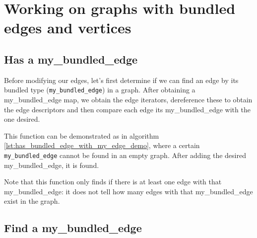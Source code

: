 \chapter{Working on graphs with bundled edges and vertices}

\section{Has a my\_bundled\_edge}
\label{subsec:has_bundled_edge_with_my_edge}

Before modifying our edges, let's first determine if we can find an edge
by its bundled type (\verb;my_bundled_edge;) in a graph.
After obtaining a my\_bundled\_edge map, 
we obtain the edge iterators, dereference these to obtain 
the edge descriptors and then compare each edge its my\_bundled\_edge 
with the one desired.



This function can be demonstrated as in algorithm 
\ref{lst:has_bundled_edge_with_my_edge_demo}, 
where a certain \verb;my_bundled_edge; cannot be found in an empty graph.
After adding the desired my\_bundled\_edge, it is found.



Note that this function only finds if there is at least one edge with that
my\_bundled\_edge: it does not tell how many edges with that my\_bundled\_edge
exist in the graph.

\section{Find a my\_bundled\_edge}
\label{subsec:find_first_bundled_edge_with_my_edge}

